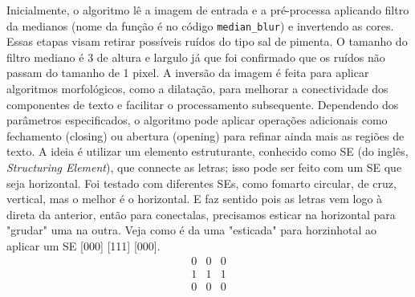 \documentclass[english, 
               brazil, 
               bsc] %
               {dcomp-abntex2}
\begin{document}
Inicialmente, o algoritmo lê a imagem de entrada e a pré-processa aplicando filtro da medianos (nome da função é no código \texttt{median\_blur}) e invertendo as cores. Essas etapas visam retirar possíveis ruídos do tipo sal de pimenta. O tamanho do filtro mediano é 3 de altura e largulo já que foi confirmado que os ruídos não passam do tamanho de 1 pixel. A inversão da imagem é feita para aplicar algoritmos morfológicos, como a dilatação, para melhorar a conectividade dos componentes de texto e facilitar o processamento subsequente. Dependendo dos parâmetros especificados, o algoritmo pode aplicar operações adicionais como fechamento (closing) ou abertura (opening) para refinar ainda mais as regiões de texto. A ideia é utilizar um elemento estruturante, conhecido como SE (do inglês, \textit{Structuring Element}), que connecte as letras; isso pode ser feito com um SE que seja horizontal. Foi testado com diferentes SEs, como fomarto circular, de cruz, vertical, mas o melhor é o horizontal. E faz sentido pois as letras vem logo à direta da anterior, então para conectalas, precisamos esticar na horizontal para "grudar" uma na outra. Veja como é da uma "esticada" para horzinhotal ao aplicar um SE [000] [111] [000].
\[
\begin{matrix}
0 & 0 & 0 \\
1 & 1 & 1 \\
0 & 0 & 0 \\
\end{matrix}
\]
\end{document}
